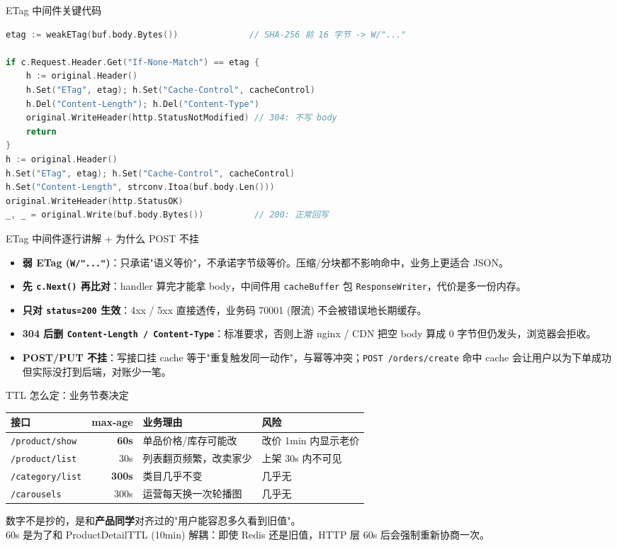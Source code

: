 \documentclass[aspectratio=169,11pt]{beamer}
\begin{document}
\begin{frame}{ETag 中间件关键代码}
\begin{lstlisting}[language=Go,firstnumber=78,
  caption={}]
etag := weakETag(buf.body.Bytes())              // SHA-256 前 16 字节 -> W/"..."

if c.Request.Header.Get("If-None-Match") == etag {
    h := original.Header()
    h.Set("ETag", etag); h.Set("Cache-Control", cacheControl)
    h.Del("Content-Length"); h.Del("Content-Type")
    original.WriteHeader(http.StatusNotModified) // 304: 不写 body
    return
}
h := original.Header()
h.Set("ETag", etag); h.Set("Cache-Control", cacheControl)
h.Set("Content-Length", strconv.Itoa(buf.body.Len()))
original.WriteHeader(http.StatusOK)
_, _ = original.Write(buf.body.Bytes())          // 200: 正常回写
\end{lstlisting}
\end{frame}

\begin{frame}[shrink]{ETag 中间件逐行讲解 + 为什么 POST 不挂}
\begin{itemize}
  \item \textbf{弱 ETag (\texttt{W/"..."})}：只承诺"语义等价"，不承诺字节级等价。压缩/分块都不影响命中，业务上更适合 JSON。
  \item \textbf{先 \texttt{c.Next()} 再比对}：handler 算完才能拿 body，中间件用 \texttt{cacheBuffer} 包 \texttt{ResponseWriter}，代价是多一份内存。
  \item \textbf{只对 \texttt{status=200} 生效}：4xx / 5xx 直接透传，业务码 70001 (限流) 不会被错误地长期缓存。
  \item \textbf{304 后删 \texttt{Content-Length / Content-Type}}：标准要求，否则上游 nginx / CDN 把空 body 算成 0 字节但仍发头，浏览器会拒收。
  \item \textbf{POST/PUT 不挂}：写接口挂 cache 等于"重复触发同一动作"，与幂等冲突；\texttt{POST /orders/create} 命中 cache 会让用户以为下单成功但实际没打到后端，对账少一笔。
\end{itemize}
\end{frame}

\begin{frame}[shrink]{TTL 怎么定：业务节奏决定}
\begin{tabular}{@{}lrll@{}}
\toprule
接口 & max-age & 业务理由 & 风险 \\
\midrule
\texttt{/product/show}    & \textbf{60s}  & 单品价格/库存可能改  & 改价 1min 内显示老价 \\
\texttt{/product/list}    & 30s           & 列表翻页频繁，改卖家少 & 上架 30s 内不可见 \\
\texttt{/category/list}   & \textbf{300s} & 类目几乎不变         & 几乎无 \\
\texttt{/carousels}       & 300s          & 运营每天换一次轮播图  & 几乎无 \\
\bottomrule
\end{tabular}
\vspace{3mm}
\small 数字不是抄的，是和\textbf{产品同学}对齐过的"用户能容忍多久看到旧值"。\\
60s 是为了和 ProductDetailTTL (10min) 解耦：即使 Redis 还是旧值，HTTP 层 60s 后会强制重新协商一次。
\end{frame}
\end{document}
